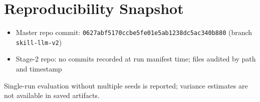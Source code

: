\section{Reproducibility Snapshot}

\begin{itemize}
  \item Master repo commit: \texttt{0627abf5170ccbe5fe01e5ab1238dc5ac340b880} (branch \texttt{skill-llm-v2})
  \item Stage-2 repo: no commits recorded at run manifest time; files audited by path and timestamp
\end{itemize}

Single-run evaluation without multiple seeds is reported; variance estimates are not available in saved artifacts.
